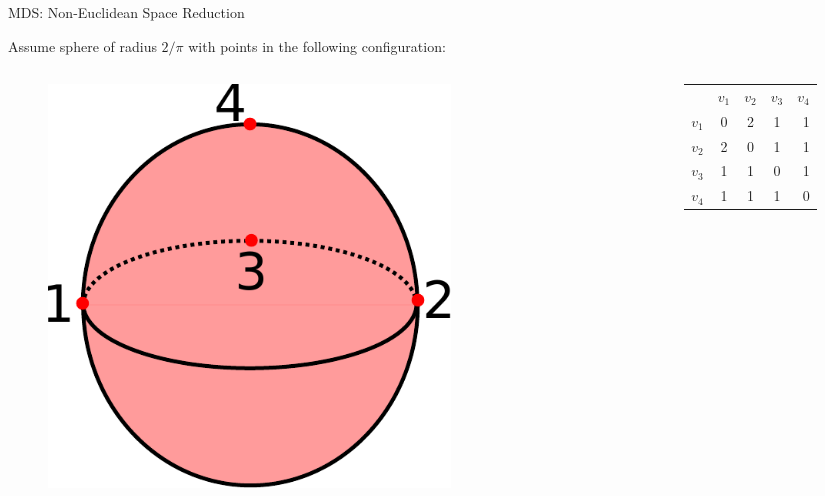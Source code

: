 \documentclass{beamer}
\begin{document}
\begin{frame}{MDS: Non-Euclidean Space Reduction}

Assume sphere of radius $2/\pi$ with points in the following configuration:

\begin{columns}
\begin{column}[T]{4cm}
\begin{figure}[t]
    \includegraphics[width=0.7\textwidth]{SphereLinial.pdf}
\end{figure}
\end{column}

\begin{column}[T]{4cm}
\begin{center}
  \begin{tabular}{ | l | c | c | c | r | }
     & $v_1$ & $v_2$ & $v_3$ & $v_4$ \\
    $v_1$ & 0 & 2 & 1 & 1 \\ \hline
    $v_2$ & 2 & 0 & 1 & 1 \\ \hline
    $v_3$ & 1 & 1 & 0 & 1 \\ \hline
    $v_4$ & 1 & 1 & 1 & 0
  \end{tabular}
\end{center}
\end{column}
\end{columns}

\begin{columns}
\begin{column}[T]{4cm}
\end{column}


\end{columns}
\end{frame}
\end{document}
